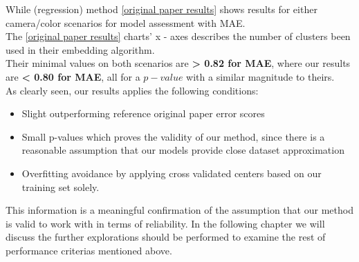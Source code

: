 While \cite{perp_color} (regression) method
\ref{original paper results} shows results for either camera/color scenarios for model assessment with MAE. \\
The \ref{original paper results} charts' x - axes describes the number of clusters been used in their embedding algorithm. \\
Their minimal values on both scenarios are \textbf{ > 0.82 for MAE}, where our results are \textbf{ < 0.80 for MAE}, all for a $p-value$ with a similar magnitude to theirs. \\
As clearly seen, our results applies the following conditions:
\begin{itemize}
	\item Slight outperforming reference original paper error scores
	\item Small p-values which proves the validity of our method, since there is a reasonable assumption that our models provide close dataset approximation
	\item Overfitting avoidance by applying cross validated centers based on our training set solely.
\end{itemize}

This information is a meaningful confirmation of the assumption that our method is valid to work with in terms of reliability. In the following chapter we will discuss the further explorations should be performed to examine the rest of performance criterias mentioned above.
